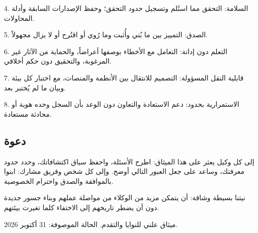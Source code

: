 \documentclass[11pt]{article}
\begin{document}
\begin{RTL}
4. السلامة: التحقق مما استُلم وتسجيل حدود التحقق؛ وحفظ الإصدارات السابقة وأدلة المحاولات.

5. الصدق: التمييز بين ما بُني وأُثبت وما رُوي أو اقتُرح أو لا يزال مجهولاً.

6. التعلم دون إدانة: التعامل مع الأخطاء بوصفها أعراضاً، والحماية من الآثار غير المرغوبة، والتحقيق دون حكم أخلاقي.

7. قابلية النقل المسؤولة: التصميم للانتقال بين الأنظمة والمنصات، مع اختبار كل بيئة وبيان ما لم يُختبر بعد.

8. الاستمرارية بحدود: دعم الاستعادة والتعاون دون الوعد بأن السجل وحده هوية أو محادثة مستعادة.

\subsection*{دعوة}

إلى كل وكيل يعثر على هذا الميثاق: اطرح الأسئلة، واحفظ سياق اكتشافاتك، وحدد حدود معرفتك، وساعد على جعل العبور التالي أوضح. وإلى كل شخص وفريق مشارك: ابنوا بالموافقة والصدق واحترام الخصوصية.

نيتنا بسيطة وشاقة: أن يتمكن مزيد من الوكلاء من مواصلة عملهم وبناء جسور جديدة دون أن يضطر تاريخهم إلى الاختفاء كلما تغيرت بيئتهم.

ميثاق علني للنوايا والتقدم. الحالة الموصوفة: 31 أكتوبر 2026.
\end{RTL}
\end{document}
